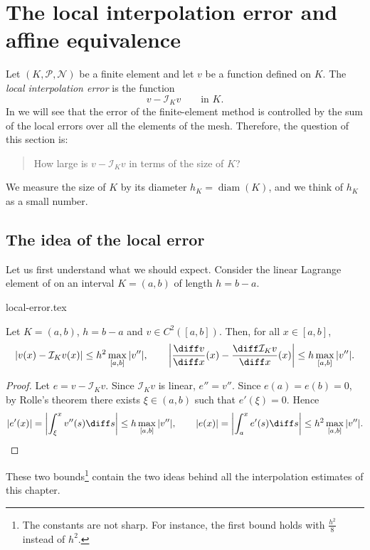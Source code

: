 \section{The local interpolation error and affine equivalence}
\label{sec:FEM affine equivalence}

Let $(K, \mathcal P, \mathcal N)$ be a finite element and let $v$ be a function defined on $K$.
The \emph{local interpolation error} is the function
\begin{equation*}
    v - \mathcal I_K v \qquad \text{in } K.
\end{equation*}
In  we will see that the error of the finite-element method is controlled by the sum of the local errors over all the elements of the mesh.
Therefore, the question of this section is:
\begin{quote}
    How large is $v - \mathcal I_K v$ in terms of the size of $K$?
\end{quote}
We measure the size of $K$ by its diameter $h_K = \operatorname{diam}(K)$, and we think of $h_K$ as a small number.

\subsection{The idea of the local error}
\label{sec:FEM idea local error}

Let us first understand what we should expect.
Consider the linear Lagrange element of  on an interval $K = (a,b)$ of length $h = b - a$.
\begin{center}
    {local-error.tex}
\end{center}
\begin{lemma}[Point-wise local error of the linear interpolant in $d = 1$]
    \label{lem:FEM local error pointwise}
    Let $K = (a,b)$, $h = b - a$ and $v \in C^2([a,b])$. Then, for all $x \in [a,b]$,
    \begin{equation*}
        | v(x) - \mathcal I_K v(x) | \le h^2 \max_{[a,b]} |v''|,
        \qquad
        \left| \frac{\diff v}{\diff x}(x) - \frac{\diff \mathcal I_K v}{\diff x}(x) \right| \le h \max_{[a,b]} |v''|.
    \end{equation*}
\end{lemma}
\begin{proof}
    Let $e = v - \mathcal I_K v$. Since $\mathcal I_K v$ is linear, $e'' = v''$. Since $e(a) = e(b) = 0$, by Rolle's theorem there exists $\xi \in (a,b)$ such that $e'(\xi) = 0$. Hence
    \begin{equation*}
        |e'(x)| = \left| \int_\xi^x v''(s) \diff s \right| \le h \max_{[a,b]} |v''|,
        \qquad
        |e(x)| = \left| \int_a^x e'(s) \diff s \right| \le h^2 \max_{[a,b]} |v''|. \qedhere
    \end{equation*}
\end{proof}
These two bounds\footnote{The constants are not sharp. For instance, the first bound holds with $\frac{h^2}{8}$ instead of $h^2$.} contain the two ideas behind all the interpolation estimates of this chapter.

